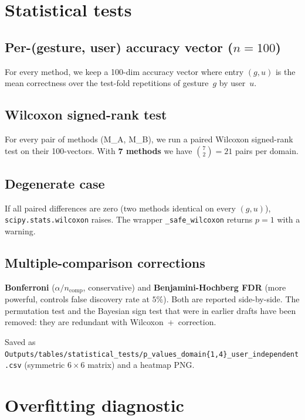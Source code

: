\documentclass[11pt,a4paper]{article}
\begin{document}
\section{Statistical tests}

\subsection{Per-(gesture, user) accuracy vector ($n=100$)}
For every method, we keep a 100-dim accuracy vector where entry
$(g, u)$ is the mean correctness over the test-fold repetitions of
gesture~$g$ by user~$u$.

\subsection{Wilcoxon signed-rank test}
For every pair of methods (M_A, M_B), we run a paired Wilcoxon
signed-rank test on their 100-vectors. With \textbf{7 methods} we have
$\binom{7}{2}=21$ pairs per domain.

\subsection{Degenerate case}
If all paired differences are zero (two methods identical on every
$(g,u)$), \verb|scipy.stats.wilcoxon| raises. The wrapper
\verb|_safe_wilcoxon| returns $p=1$ with a warning.

\subsection{Multiple-comparison corrections}
\textbf{Bonferroni} ($\alpha/n_{\text{comp}}$, conservative) and
\textbf{Benjamini-Hochberg FDR} (more powerful, controls false
discovery rate at $5\%$). Both are reported side-by-side. The
permutation test and the Bayesian sign test that were in earlier
drafts have been removed: they are redundant with Wilcoxon~+~correction.

Saved as \texttt{Outputs/tables/statistical\_tests/p\_values\_domain\{1,4\}\_user\_independent.csv}
(symmetric $6\times 6$ matrix) and a heatmap PNG.

\section{Overfitting diagnostic}\label{sec:overfitting}
\end{document}
